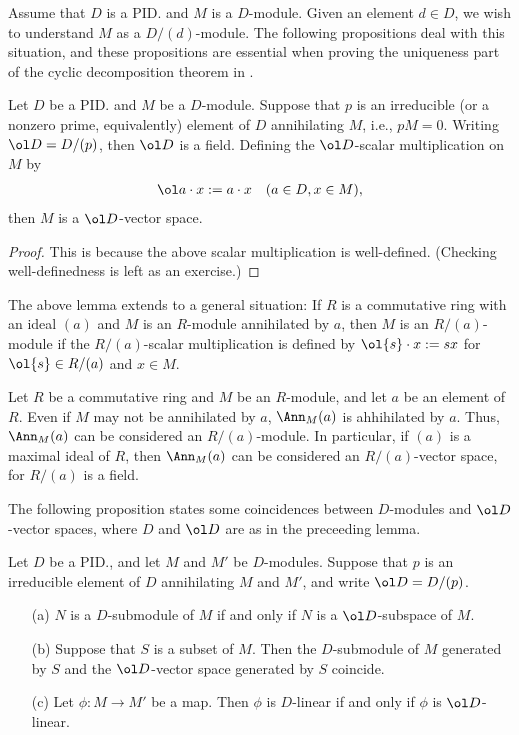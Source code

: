 Assume that $D$ is a PID. and $M$ is a $D$-module.
Given an element $d\in D$, we wish to understand $M$ as a $D/(d)$-module.
The following propositions deal with this situation, and these propositions are essential when proving the uniqueness part of the cyclic decomposition theorem in .
\begin{lem}
    Let $D$ be a PID. and $M$ be a $D$-module.
    Suppose that $p$ is an irreducible (or a nonzero prime, equivalently) element of $D$ annihilating $M$, i.e., $pM=0$.
    Writing $\ol D=D/(p)$, then $\ol D$ is a field.
    Defining the $\ol D$-scalar multiplication on $M$ by
    \begin{align*}
        \ol a \cdot x:=a \cdot x\quad(a\in D, x\in M),
    \end{align*}
    then $M$ is a $\ol D$-vector space.
\end{lem}
\begin{proof}
    This is because the above scalar multiplication is well-defined. \color{brown}(Checking well-definedness is left as an exercise.)\color{black}
\end{proof}
\begin{rmk}
    The above lemma extends to a general situation: If $R$ is a commutative ring with an ideal $(a)$ and $M$ is an $R$-module annihilated by $a$, then $M$ is an $R/(a)$-module if the $R/(a)$-scalar multiplication is defined by $\ol{s}\cdot x:=sx$ for $\ol{s}\in R/(a)$ and $x\in M$.
\end{rmk}
\begin{exmp}
    Let $R$ be a commutative ring and $M$ be an $R$-module, and let $a$ be an element of $R$.
    Even if $M$ may not be annihilated by $a$, $\Ann_M(a)$ is ahhihilated by $a$.
    Thus, $\Ann_M(a)$ can be considered an $R/(a)$-module.
    In particular, if $(a)$ is a maximal ideal of $R$, then $\Ann_M(a)$ can be considered an $R/(a)$-vector space, for $R/(a)$ is a field.
\end{exmp}
The following proposition states some coincidences between $D$-modules and $\ol D$-vector spaces, where $D$ and $\ol D$ are as in the preceeding lemma.
\begin{prop}
    Let $D$ be a PID., and let $M$ and $M'$ be $D$-modules.
    Suppose that $p$ is an irreducible element of $D$ annihilating $M$ and $M'$, and write $\ol D=D/(p)$.
    \begin{enumerate}
        \item[(a)]
        {
            $N$ is a $D$-submodule of $M$ if and only if $N$ is a $\ol D$-subspace of $M$.
        }
        \item[(b)]
        {
            Suppose that $S$ is a subset of $M$.
            Then the $D$-submodule of $M$ generated by $S$ and the $\ol D$-vector space generated by $S$ coincide.
        }
        \item[(c)]
        {
            Let $\phi: M\rightarrow M'$ be a map.
            Then $\phi$ is $D$-linear if and only if $\phi$ is $\ol D$-linear.
        }
    \end{enumerate}
\end{prop}
